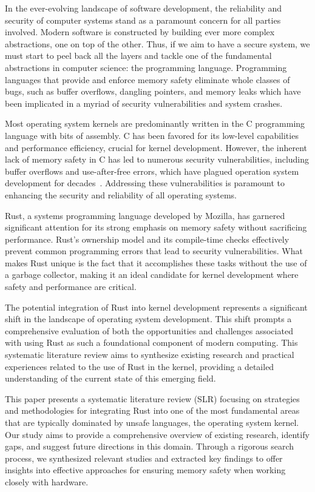 \documentclass[sigconf,review,anonymous]{acmart}
\begin{document}
In the ever-evolving landscape of software development, the reliability and security of computer
systems stand as a paramount concern for all parties involved. Modern software is constructed by
building ever more complex abstractions, one on top of the other. Thus, if we aim to have a secure
system, we must start to peel back all the layers and tackle one of the fundamental abstractions in
computer science: the programming language. Programming languages that provide and enforce memory
safety eliminate whole classes of bugs, such as buffer overflows, dangling pointers, and memory leaks
which have been implicated in a myriad of security vulnerabilities and system crashes.

Most operating system kernels are predominantly written in the C programming language with bits of
assembly. C has been favored for its low-level capabilities and performance efficiency, crucial for
kernel development. However, the inherent lack of memory safety in C has led to numerous security
vulnerabilities, including buffer overflows and use-after-free errors, which have plagued operation
system development for decades~\cite{noauthor_undated-bf}. Addressing these vulnerabilities is
paramount to enhancing the security and reliability of all operating systems.

Rust, a systems programming language developed by Mozilla, has garnered significant attention for
its strong emphasis on memory safety without sacrificing performance. Rust's ownership model and its
compile-time checks effectively prevent common programming errors that lead to security
vulnerabilities. What makes Rust unique is the fact that it accomplishes these tasks without the use
of a garbage collector, making it an ideal candidate for kernel development where safety and
performance are critical.~\cite{}

The potential integration of Rust into kernel development represents a significant shift in the
landscape of operating system development. This shift prompts a comprehensive evaluation of both the
opportunities and challenges associated with using Rust as such a foundational component of modern
computing. This systematic literature review aims to synthesize existing research and practical
experiences related to the use of Rust in the kernel, providing a detailed understanding of
the current state of this emerging field.

This paper presents a systematic literature review (SLR) focusing on strategies and methodologies
for integrating Rust into one of the most fundamental areas that are typically dominated by unsafe
languages, the operating system kernel. Our study aims to provide a comprehensive overview of
existing research, identify gaps, and suggest future directions in this domain. Through a rigorous
search process, we synthesized relevant studies and extracted key findings to offer insights into
effective approaches for ensuring memory safety when working closely with hardware.
\end{document}
